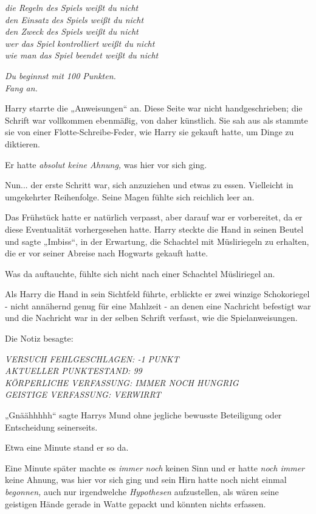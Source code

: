 {\emph{die Regeln des Spiels weißt du nicht\\ den Einsatz des Spiels weißt du nicht\\ den Zweck des Spiels weißt du nicht\\ wer das Spiel kontrolliert weißt du nicht\\ wie man das Spiel beendet weißt du nicht}

\emph{Du beginnst mit 100 Punkten.\\ Fang an.}

Harry starrte die „Anweisungen“ an. Diese Seite war nicht handgeschrieben; die Schrift war vollkommen ebenmäßig, von daher künstlich. Sie sah aus als stammte sie von einer Flotte-Schreibe-Feder, wie Harry sie gekauft hatte, um Dinge zu diktieren.

Er hatte \emph{absolut keine Ahnung,} was hier vor sich ging.

Nun... der erste Schritt war, sich anzuziehen und etwas zu essen. Vielleicht in umgekehrter Reihenfolge. Seine Magen fühlte sich reichlich leer an.

Das Frühstück hatte er natürlich verpasst, aber darauf war er vorbereitet, da er diese Eventualität vorhergesehen hatte. Harry steckte die Hand in seinen Beutel und sagte „Imbiss“, in der Erwartung, die Schachtel mit Müsliriegeln zu erhalten, die er vor seiner Abreise nach Hogwarts gekauft hatte.

Was da auftauchte, fühlte sich nicht nach einer Schachtel Müsliriegel an.

Als Harry die Hand in sein Sichtfeld führte, erblickte er zwei winzige Schokoriegel - nicht annähernd genug für eine Mahlzeit - an denen eine Nachricht befestigt war und die Nachricht war in der selben Schrift verfasst, wie die Spielanweisungen.

Die Notiz besagte:

\emph{VERSUCH FEHLGESCHLAGEN: -1 PUNKT\\ AKTUELLER PUNKTESTAND: 99\\ KÖRPERLICHE VERFASSUNG: IMMER NOCH HUNGRIG\\ GEISTIGE VERFASSUNG: VERWIRRT}

„Gnäähhhhh“ sagte Harrys Mund ohne jegliche bewusste Beteiligung oder Entscheidung seinerseits.

Etwa eine Minute stand er so da.

Eine Minute später machte es \emph{immer noch} keinen Sinn und er hatte \emph{noch immer} keine Ahnung, was hier vor sich ging und sein Hirn hatte noch nicht einmal \emph{begonnen,} auch nur irgendwelche \emph{Hypothesen} aufzustellen, als wären seine geistigen Hände gerade in Watte gepackt und könnten nichts erfassen.

}
